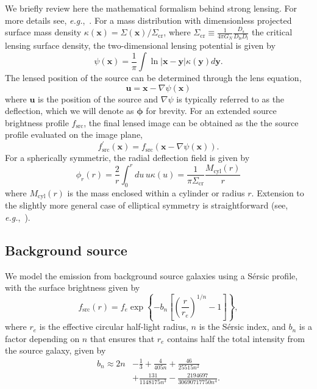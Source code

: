 \documentclass[twocolumn]{aastex62}
\begin{document}
We briefly review here the mathematical formalism behind strong lensing. For more details see, \emph{e.g.},~\cite{2001astro.ph..2341K,1992grle.book.....S}. For a mass distribution with dimensionless projected surface mass density $\kappa(\mathbf{x})=\Sigma(\mathbf{x}) / \Sigma_{\mathrm{cr}}$, where $\Sigma_{\mathrm{cr}}\equiv \frac{1}{4 \pi G_N} \frac{D_{\mathrm{s}}}{D_{\mathrm{ls}} D_{\mathrm{l}}}$ the critical lensing surface density, the two-dimensional lensing potential is given by
\begin{equation}
\psi(\mathbf{x})=\frac{1}{\pi} \int \ln |\mathbf{x}-\mathbf{y}| \kappa(\mathbf{y}) d \mathbf{y}.
\end{equation}
The lensed position of the source can be determined through the lens equation,
\begin{equation}
\mathbf{u}=\mathbf{x}-\nabla \psi(\mathbf{x})
\end{equation}
where $\mathbf{u}$ is the position of the source and $\nabla \psi$ is typically referred to as the deflection, which we will denote as $\boldsymbol\phi$ for brevity. For an extended source brightness profile $f_\mathrm{src}$, the final lensed image can be obtained as the the source profile evaluated on the image plane,
\begin{equation}
f^\prime_\mathrm{src}(\mathbf x) = f_\mathrm{src}(\mathbf{x}-\nabla \psi(\mathbf{x})).
\end{equation}
For a spherically symmetric, the radial deflection field is given by
\begin{equation}
\phi_{r}(r)=\frac{2}{r} \int_{0}^{r}du\,u \kappa(u) =\frac{1}{\pi \Sigma_{\mathrm{cr}}} \frac{M_{\mathrm{cyl}}(r)}{r}
\end{equation}
where $M_{\mathrm{cyl}}(r)$ is the mass enclosed within a cylinder or radius $r$. Extension to the slightly more general case of elliptical symmetry is straightforward (see, \emph{e.g.},~\cite{2001astro.ph..2341K}).

\subsection{Background source}

We model the emission from background source galaxies using a S\'{e}rsic profile, with the surface brightness given by
\begin{equation}
f_\mathrm{src}(r)=f_{e} \exp \left\{-b_{n}\left[\left(\frac{r}{r_{e}}\right)^{1 / n}-1\right]\right\},
\end{equation}
where $r_e$ is the effective circular half-light radius, $n$ is the S\'{e}rsic index, and $b_n$ is a factor depending on $n$ that ensures that $r_e$ contains half the total intensity from the source galaxy, given by~\citep{1999A&A...352..447C}
\begin{align}
b_n \approx 2 n &- \frac{1}{3} + \frac{4}{405 n} + \frac{46}{25515 n^2} \nonumber \\ &+ \frac{131}{1148175 n^3} - \frac{2194697}{30690717750 n^4}. \nonumber
\end{align}
\end{document}
